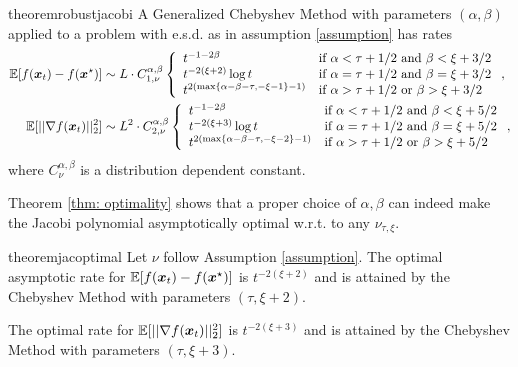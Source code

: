 \documentclass{article}
\begin{document}
\begin{restatable}{theorem}{robustjacobi}\label{thm: jacobirates}
A Generalized Chebyshev Method with parameters $(\alpha,\beta)$ applied to a problem with e.s.d. as in assumption \ref{assumption} has rates
\begin{align}
\mathbb{E}[f({\boldsymbol x}_t)-f({\boldsymbol x}^\star)]&\sim L\cdot C^{\alpha,\beta}_{1,\nu}
    \left\{\begin{array}{ll}
    t^{-1-2\beta} &\mbox{if } 
		  \alpha<\tau+1/2 \text{ and } \beta <\xi+3/2\\
		  t^{-2(\xi+2)}\log t& \mbox{if } 
		  \alpha=\tau+1/2 \text{ and } \beta =\xi+3/2\\
		  t^{2(\max\{\alpha-\beta-\tau,-\xi-1\}-1)}& \mbox{if } 
		  \alpha>\tau+1/2 \text{ or } \beta >\xi+3/2
	\end{array}\right. ,\\
	\mathbb{E}[||\nabla f({\boldsymbol x}_t)||^2_2]&\sim L^2\cdot C^{\alpha,\beta}_{2,\nu}
        \left\{\begin{array}{ll}
    t^{-1-2\beta} &\mbox{if } 
		  \alpha<\tau+1/2 \text{ and } \beta <\xi+5/2\\
		  t^{-2(\xi+3)}\log t& \mbox{if } 
		  \alpha=\tau+1/2 \text{ and } \beta =\xi+5/2\\
		  t^{2(\max\{\alpha-\beta-\tau,-\xi-2\}-1)}& \mbox{if } 
		  \alpha>\tau+1/2 \text{ or } \beta >\xi+5/2
	\end{array}\right. ,
\end{align}
where $C^{\alpha,\beta}_\nu$ is a distribution dependent constant.
\end{restatable}

Theorem \ref{thm: optimality} shows that a proper choice of $\alpha,\beta$ can indeed make the Jacobi polynomial asymptotically optimal w.r.t. to any $\nu_{\tau,\xi}$. 

\begin{restatable}{theorem}{jacoptimal}\label{thm: optimality}
Let $\nu$ follow Assumption \ref{assumption}.
The optimal asymptotic rate for $\mathbb{E}[f({\boldsymbol x}_t)-f({\boldsymbol x}^\star)]$ is $t^{-2(\xi+2)}$ and is attained by the Chebyshev Method with parameters $(\tau,\xi+2)$. 


The optimal rate for $\mathbb{E}[||\nabla f({\boldsymbol x}_t)||^2_2]$ is $t^{-2(\xi+3)}$ and is attained by the Chebyshev Method with parameters $(\tau,\xi+3)$.
\end{restatable}
\end{document}
